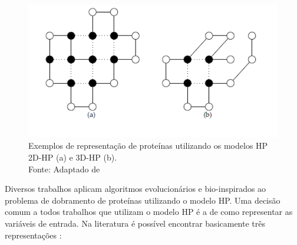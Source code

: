 \begin{figure}[!htb]
	\centering
	\includegraphics[scale=.9]{Imagens/modeloHPExemplo.png}
	\caption{Exemplos de representação de proteínas utilizando os modelos HP 2D-HP (a) e 3D-HP (b). \\ Fonte: Adaptado de \cite{benitez2015algoritmo}}
	\label{fig:exemploModeloHP}
\end{figure}


Diversos trabalhos aplicam algoritmos evolucionários e bio-inspirados ao problema de dobramento de proteínas utilizando o modelo HP. Uma decisão comum a todos trabalhos que utilizam o modelo HP é a de como representar as variáveis de entrada. Na literatura é possível encontrar basicamente três representações \cite{krasnogor1999protein, lopes2008evolutionary}: 

